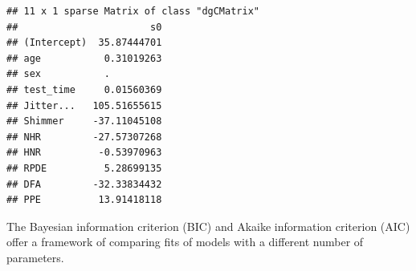 \documentclass[
]{article}
\newenvironment{Shaded}{\begin{snugshade}}{\end{snugshade}}
\newcommand{\AttributeTok}[1]{\textcolor[rgb]{0.13,0.29,0.53}{#1}}
\newcommand{\CommentTok}[1]{\textcolor[rgb]{0.56,0.35,0.01}{\textit{#1}}}
\newcommand{\DecValTok}[1]{\textcolor[rgb]{0.00,0.00,0.81}{#1}}
\newcommand{\FunctionTok}[1]{\textcolor[rgb]{0.13,0.29,0.53}{\textbf{#1}}}
\newcommand{\NormalTok}[1]{#1}
\newcommand{\OtherTok}[1]{\textcolor[rgb]{0.56,0.35,0.01}{#1}}
\newcommand{\SpecialCharTok}[1]{\textcolor[rgb]{0.81,0.36,0.00}{\textbf{#1}}}
\begin{document}
\begin{Shaded}
\end{Shaded}

\begin{verbatim}
## 11 x 1 sparse Matrix of class "dgCMatrix"
##                       s0
## (Intercept)  35.87444701
## age           0.31019263
## sex           .         
## test_time     0.01560369
## Jitter...   105.51655615
## Shimmer     -37.11045108
## NHR         -27.57307268
## HNR          -0.53970963
## RPDE          5.28699135
## DFA         -32.33834432
## PPE          13.91418118
\end{verbatim}

The Bayesian information criterion (BIC) and Akaike information
criterion (AIC) offer a framework of comparing fits of models with a
different number of parameters.
\end{document}
